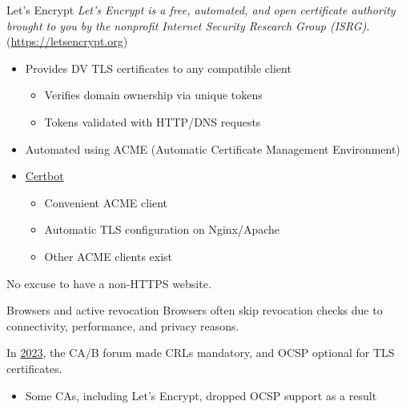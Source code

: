 \begin{frame}{Let's Encrypt}
  \pause
  \textit{Let's Encrypt is a free, automated, and open certificate authority brought to you by the nonprofit Internet Security Research Group (ISRG).} ({\scriptsize\url{https://letsencrypt.org}})
  \begin{itemize}[<+(1)->]
    \item Provides DV TLS certificates to any compatible client
    \begin{itemize}
      \item Verifies domain ownership via unique tokens
      \item Tokens validated with HTTP/DNS requests
    \end{itemize}
    \item Automated using ACME (Automatic Certificate Management Environment)
    \item \href{https://certbot.eff.org}{Certbot}
    \begin{itemize}
      \item Convenient ACME client
      \item Automatic TLS configuration on Nginx/Apache
      \item Other ACME clients exist
    \end{itemize}
  \end{itemize}

  \pause
  No excuse to have a non-HTTPS website.
\end{frame}

\begin{frame}{Browsers and active revocation}
  Browsers often skip revocation checks due to connectivity, performance, and privacy reasons.

  \vspace*{1em}

  \pause
  In \href{https://cabforum.org/2023/07/14/ballot-sc063v4-make-ocsp-optional-require-crls-and-incentivize-automation/}{2023}, the CA/B forum made CRLs mandatory, and OCSP optional for TLS certificates.
  \begin{itemize}[<+(1)->]
    \item Some CAs, including Let's Encrypt, dropped OCSP support as a result
  \end{itemize}
\end{frame}

